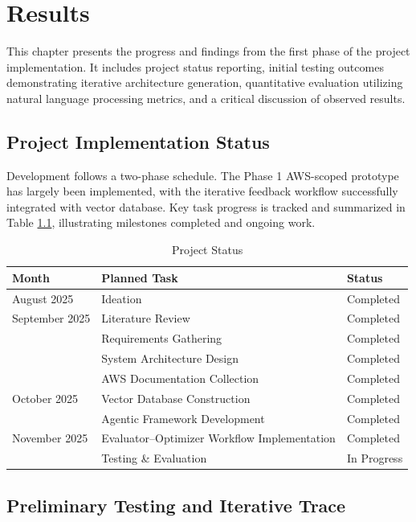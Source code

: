 \chapter{Results}

This chapter presents the progress and findings from the first phase of the project implementation. It includes project status reporting, initial testing outcomes demonstrating iterative architecture generation, quantitative evaluation utilizing natural language processing metrics, and a critical discussion of observed results.

\section{Project Implementation Status}

Development follows a two-phase schedule. The Phase 1 AWS-scoped prototype has largely been implemented, with the iterative feedback workflow successfully integrated with vector database. Key task progress is tracked and summarized in Table \ref{tab:project_status}, illustrating milestones completed and ongoing work.

\begin{table}[h]
    \centering
    \caption{Project Status}
    \label{tab:project_status}
    \begin{tabular}{@{}lll@{}}
        \toprule
        \textbf{Month} & \textbf{Planned Task} & \textbf{Status} \\
        \midrule
        August 2025 & Ideation & Completed \\
        September 2025 & Literature Review & Completed \\
         & Requirements Gathering & Completed \\
         & System Architecture Design & Completed \\
         & AWS Documentation Collection & Completed \\
        October 2025 & Vector Database Construction & Completed \\
         & Agentic Framework Development & Completed \\
        November 2025 & Evaluator--Optimizer Workflow Implementation & Completed \\
         & Testing \& Evaluation & In Progress \\
        \bottomrule
    \end{tabular}
\end{table}

\section{Preliminary Testing and Iterative Trace}

